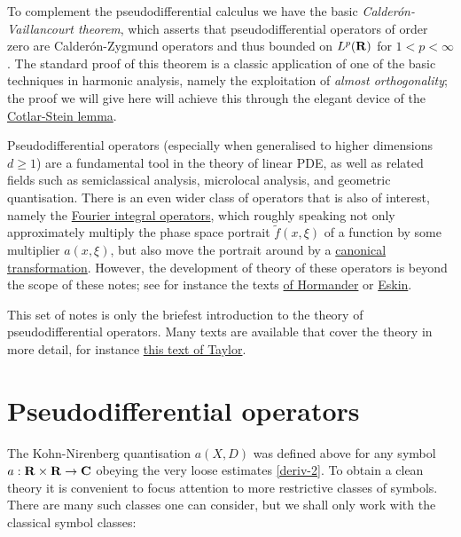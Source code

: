 \documentclass[11pt]{article}
\theoremstyle{definition}
\theoremstyle{remark}
\begin{document}
To complement the pseudodifferential calculus we have the basic \emph{Calderón-Vaillancourt theorem}, which asserts that pseudodifferential operators of order zero are Calderón-Zygmund operators and thus bounded on \({L^p({\bf R})}\) for \({1 < p < \infty}\). The standard proof of this theorem is a classic application of one of the basic techniques in harmonic analysis, namely the exploitation of \emph{almost orthogonality}; the proof we will give here will achieve this through the elegant device of the \href{https://en.wikipedia.org/wiki/Cotlar%E2%80%93Stein_lemma}{Cotlar-Stein lemma}.


Pseudodifferential operators (especially when generalised to higher dimensions \({d \geq 1}\)) are a fundamental tool in the theory of linear PDE, as well as related fields such as semiclassical analysis, microlocal analysis, and geometric quantisation. There is an even wider class of operators that is also of interest, namely the \href{https://en.wikipedia.org/wiki/Fourier_integral_operator}{Fourier integral operators}, which roughly speaking not only approximately multiply the phase space portrait \({\tilde f(x,\xi)}\) of a function by some multiplier \({a(x,\xi)}\), but also move the portrait around by a \href{https://en.wikipedia.org/wiki/Canonical_transformation}{canonical transformation}. However, the development of theory of these operators is beyond the scope of these notes; see for instance the texts \href{https://mathscinet.ams.org/mathscinet-getitem?mr=1481433}{of Hormander} or \href{https://mathscinet.ams.org/mathscinet-getitem?mr=2809923}{Eskin}.


This set of notes is only the briefest introduction to the theory of pseudodifferential operators. Many texts are available that cover the theory in more detail, for instance \href{https://mathscinet.ams.org/mathscinet-getitem?mr=1766415}{this text of Taylor}.




\section{Pseudodifferential operators}

The Kohn-Nirenberg quantisation \({a(X,D)}\) was defined above for any symbol \({a: {\bf R} \times {\bf R} \rightarrow {\bf C}}\) obeying the very loose estimates \eqref{deriv-2}. To obtain a clean theory it is convenient to focus attention to more restrictive classes of symbols. There are many such classes one can consider, but we shall only work with the classical symbol classes:
\end{document}
